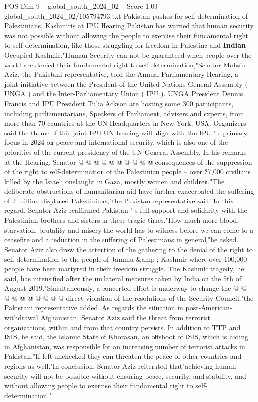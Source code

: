 \begin{textsample}{POS Dim 9 – global\_south\_2024\_02 – Score 1.00 – global\_south\_2024\_02/105794793.txt}  \label{ex:f9_pos_102}
Pakistan pushes for self-determination of Palestinians, Kashmiris at IPU Hearing Pakistan has warned that human security was not possible without allowing the people to exercise their fundamental right to self-determination, like those struggling for freedom in Palestine and \textbf{Indian} Occupied Kashmir."Human Security can not be guaranteed when people over the world are denied their fundamental right to self-determination,"Senator Mohsin Aziz, the Pakistani representative, told the Annual Parliamentary Hearing, a joint initiative between the President of the United Nations General Assembly ( UNGA ) and the Inter-Parliamentary Union ( IPU ).
UNGA President Dennis Francis and IPU President Tulia Ackson are hosting some 300 participants, including parliamentarians, Speakers of Parliament, advisers and experts, from more than 70 countries at the UN Headquarters in New York, USA.
Organizers said the theme of this joint IPU-UN hearing will align with the IPU ' s primary focus in 2024 on peace and international security, which is also one of the priorities of the current presidency of the UN General Assembly.
In his remarks at the Hearing, Senator @ @ @ @ @ @ @ @ @ @ consequences of the suppression of the right to self-determination of the Palestinian people -- over 27,000 civilians killed by the Israeli onslaught in Gaza, mostly women and children."The deliberate obstructions of humanitarian aid have further exacerbated the suffering of 2 million displaced Palestinians,"the Pakistan representative said.
In this regard, Senator Aziz reaffirmed Pakistan ' s full support and solidarity with the Palestinian brothers and sisters in these tragic times."How much more blood, starvation, brutality and misery the world has to witness before we can come to a ceasefire and a reduction in the suffering of Palestinians in general,"he asked.
Senator Aziz also drew the attention of the gathering to the denial of the right to self-determination to the people of Jammu \&amp ; Kashmir where over 100,000 people have been martyred in their freedom struggle.
The Kashmir tragedy, he said, has intensified after the unilateral measures taken by India on the 5th of August 2019."Simultaneously, a concerted effort is underway to change the @ @ @ @ @ @ @ @ @ @ direct violation of the resolutions of the Security Council,"the Pakistani representative added.
As regards the situation in post-American-withdrawal Afghanistan, Senator Aziz said the threat from terrorist organizations, within and from that country persists.
In addition to TTP and ISIS, he said, the Islamic State of Khorasan, an offshoot of ISIS, which is hiding in Afghanistan, was responsible for an increasing number of terrorist attacks in Pakistan."If left unchecked they can threaten the peace of other countries and regions as well."In conclusion, Senator Aziz reiterated that"achieving human security will not be possible without ensuring peace, security, and stability, and without allowing people to exercise their fundamental right to self-determination."

\end{textsample}
